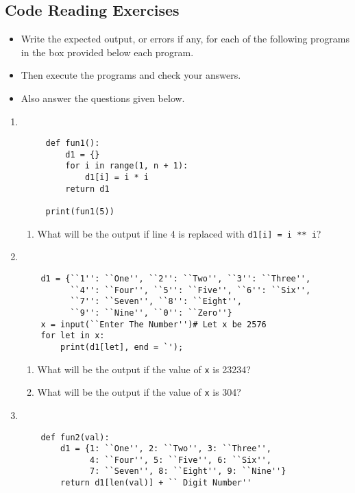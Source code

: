\documentclass[11pt,a4paper]{article}
\def\AnswerBox{\fbox{\begin{minipage}{4in}\hfill\vspace{0.5in}\end{minipage}}}
\begin{document}
\subsection*{Code Reading Exercises}
\begin{itemize}
    \item Write the expected output, or errors if any, for each of the following programs in the box provided below each program.
    \item Then execute the programs and check your answers.
    \item Also answer the questions given below.
\end{itemize}

\begin{enumerate}[label=\bfseries Program \arabic*:]

    \item ~
    \begin{lstlisting}
     def fun1():
         d1 = {}
         for i in range(1, n + 1):
             d1[i] = i * i
         return d1

     print(fun1(5))
    \end{lstlisting}
    \AnswerBox
    \begin{enumerate}[label=\bfseries Q\arabic*:]\itemsep10pt
         \item What will be the output if line 4 is replaced with \texttt{d1[i] = i ** i}?
    \end{enumerate}

    \item ~
    \begin{lstlisting}
    d1 = {``1'': ``One'', ``2'': ``Two'', ``3'': ``Three'',
          ``4'': ``Four'', ``5'': ``Five'', ``6'': ``Six'',
          ``7'': ``Seven'', ``8'': ``Eight'',
          ``9'': ``Nine'', ``0'': ``Zero''}
    x = input(``Enter The Number'')# Let x be 2576 
    for let in x:
        print(d1[let], end = `');
    \end{lstlisting}
    \AnswerBox 
    \begin{enumerate}[label=\bfseries Q\arabic*:]\itemsep10pt
         \item What will be the output if the value of \texttt{x} is 23234?
         \item What will be the output if the value of \texttt{x} is 304?
    \end{enumerate}
    \item ~
    \begin{lstlisting}
    def fun2(val):
        d1 = {1: ``One'', 2: ``Two'', 3: ``Three'',
              4: ``Four'', 5: ``Five'', 6: ``Six'', 
              7: ``Seven'', 8: ``Eight'', 9: ``Nine''}
        return d1[len(val)] + `` Digit Number''
    

\end{lstlisting}
\end{enumerate}
\end{document}
